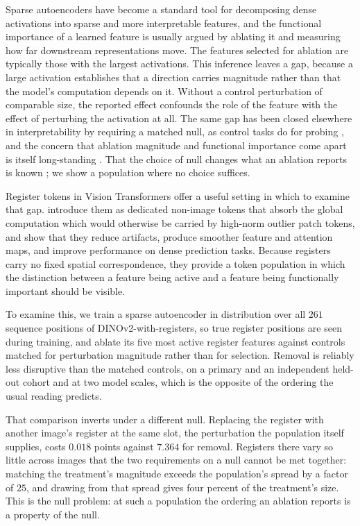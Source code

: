 \documentclass{article}
\begin{document}
Sparse autoencoders have become a standard tool for decomposing dense activations into sparse and more interpretable features, and the functional importance of a learned feature is usually argued by ablating it and measuring how far downstream representations move. The features selected for ablation are typically those with the largest activations. This inference leaves a gap, because a large activation establishes that a direction carries magnitude rather than that the model's computation depends on it. Without a control perturbation of comparable size, the reported effect confounds the role of the feature with the effect of perturbing the activation at all. The same gap has been closed elsewhere in interpretability by requiring a matched null, as control tasks do for probing \citep{hewitt2019designing}, and the concern that ablation magnitude and functional importance come apart is itself long-standing \citep{morcos2018importance}. That the choice of null changes what an ablation reports is known \citep{zhang2024towards, miller2024transformer}; we show a population where no choice suffices.

Register tokens in Vision Transformers offer a useful setting in which to examine that gap. \citet{darcet2023vision} introduce them as dedicated non-image tokens that absorb the global computation which would otherwise be carried by high-norm outlier patch tokens, and show that they reduce artifacts, produce smoother feature and attention maps, and improve performance on dense prediction tasks. Because registers carry no fixed spatial correspondence, they provide a token population in which the distinction between a feature being active and a feature being functionally important should be visible.

To examine this, we train a sparse autoencoder in distribution over all $261$ sequence positions of DINOv2-with-registers, so true register positions are seen during training, and ablate its five most active register features against controls matched for perturbation magnitude rather than for selection. Removal is reliably less disruptive than the matched controls, on a primary and an independent held-out cohort and at two model scales, which is the opposite of the ordering the usual reading predicts.

That comparison inverts under a different null. Replacing the register with another image's register at the same slot, the perturbation the population itself supplies, costs $0.018$ points against $7.364$ for removal. Registers there vary so little across images that the two requirements on a null cannot be met together: matching the treatment's magnitude exceeds the population's spread by a factor of $25$, and drawing from that spread gives four percent of the treatment's size. This is the null problem: at such a population the ordering an ablation reports is a property of the null.
\end{document}
